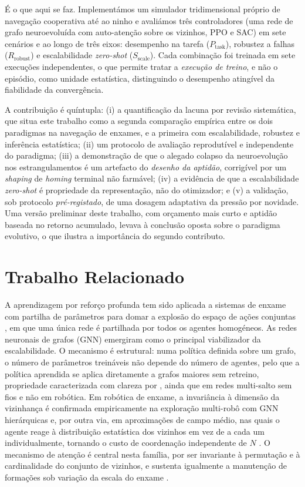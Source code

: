\documentclass[final,5p,times,twocolumn,authoryear]{elsarticle}
\begin{document}
É o que aqui se faz. Implementámos um simulador tridimensional próprio
de navegação cooperativa até ao ninho e avaliámos três controladores (uma rede de grafo
neuroevoluída com auto-atenção sobre os vizinhos, PPO e SAC) em sete cenários e
ao longo de três eixos: desempenho na tarefa ($P_{\text{task}}$), robustez a
falhas ($R_{\text{robust}}$) e escalabilidade \emph{zero-shot}
($S_{\text{scale}}$). Cada combinação foi treinada em sete execuções
independentes, o que permite tratar a \emph{execução de treino}, e não o
episódio, como unidade estatística, distinguindo o desempenho atingível da
fiabilidade da convergência.

A contribuição é quíntupla: (i) a quantificação da lacuna por revisão sistemática,
que situa este trabalho como a segunda comparação empírica entre os dois
paradigmas na navegação de enxames, e a primeira com escalabilidade, robustez e
inferência estatística; (ii) um protocolo de avaliação reprodutível e independente
do paradigma; (iii) a demonstração de que o alegado colapso da neuroevolução nos
estrangulamentos é um artefacto do \emph{desenho da aptidão}, corrigível por um
\emph{shaping} de \emph{homing} terminal não farmável; (iv) a evidência de que a
escalabilidade \emph{zero-shot} é propriedade da representação, não do otimizador;
e (v) a validação, sob protocolo \emph{pré-registado}, de uma dosagem adaptativa
da pressão por novidade. Uma versão preliminar deste trabalho, com orçamento mais
curto e aptidão baseada no retorno acumulado, levava à conclusão oposta sobre o
paradigma evolutivo, o que ilustra a importância do segundo contributo.

\section{Trabalho Relacionado}
\label{sec:related}
A aprendizagem por reforço profunda tem sido aplicada a sistemas de enxame com
partilha de parâmetros para domar a explosão do espaço de ações conjuntas
\citep{huttenrauch2019deep}, em que uma única rede é partilhada por todos os
 agentes homogéneos. As redes neuronais de grafos (GNN) emergiram como o principal
viabilizador da escalabilidade. O mecanismo é estrutural: numa política definida
sobre um grafo, o número de parâmetros treináveis não depende do número de
agentes, pelo que a política aprendida se aplica diretamente a grafos maiores sem
retreino, propriedade caracterizada com clareza por \citet{chen2024graph}, ainda
que em redes multi-salto sem fios e não em robótica. Em robótica de enxame, a
invariância à dimensão da vizinhança é confirmada empiricamente na exploração
multi-robô com GNN hierárquicas \citep{zhang2022h2gnn} e, por outra via, em
aproximações de campo médio, nas quais o agente reage à distribuição estatística
dos vizinhos em vez de a cada um individualmente, tornando o custo de coordenação
independente de $N$ \citep{tang2023meanfield}. O mecanismo de atenção
\citep{vaswani2017attention, velickovic2018gat} é central nesta família, por ser
invariante à permutação e à cardinalidade do conjunto de vizinhos, e sustenta
igualmente a manutenção de formações sob variação da escala do enxame
\citep{li2024shape}.
\end{document}
